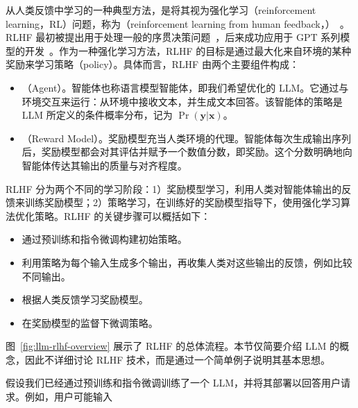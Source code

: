 从人类反馈中学习的一种典型方法，是将其视为强化学习（reinforcement learning，RL）问题，称为（reinforcement learning from human feedback，）~\cite{ouyang-etal:2022training}。RLHF 最初被提出用于处理一般的序贯决策问题~\cite{christiano-etal:2017deep}，后来成功应用于 GPT 系列模型的开发~\cite{stiennon-etal:2020learning}。作为一种强化学习方法，RLHF 的目标是通过最大化来自环境的某种奖励来学习策略（policy）。具体而言，RLHF 由两个主要组件构成：

\begin{itemize}
\item \vspace{0.5em} （Agent）。智能体也称语言模型智能体，即我们希望优化的 LLM。它通过与环境交互来运行：从环境中接收文本，并生成文本回答。该智能体的策略是 LLM 所定义的条件概率分布，记为 $\Pr(\mathbf{y} | \mathbf{x})$。
\item \vspace{0.3em} （Reward Model）。奖励模型充当人类环境的代理。智能体每次生成输出序列后，奖励模型都会对其评估并赋予一个数值分数，即奖励。这个分数明确地向智能体传达其输出的质量与对齐程度。
\end{itemize}
\vspace{0.5em}

RLHF 分为两个不同的学习阶段：1）奖励模型学习，利用人类对智能体输出的反馈来训练奖励模型；2）策略学习，在训练好的奖励模型指导下，使用强化学习算法优化策略。RLHF 的关键步骤可以概括如下：

\begin{itemize}
\item \vspace{0.5em} 通过预训练和指令微调构建初始策略。
\item \vspace{0.3em} 利用策略为每个输入生成多个输出，再收集人类对这些输出的反馈，例如比较不同输出。
\item \vspace{0.3em} 根据人类反馈学习奖励模型。
\item \vspace{0.3em} 在奖励模型的监督下微调策略。
\end{itemize}
\vspace{0.5em}

图~\ref{fig:llm-rlhf-overview} 展示了 RLHF 的总体流程。本节仅简要介绍 LLM 的概念，因此不详细讨论 RLHF 技术，而是通过一个简单例子说明其基本思想。

假设我们已经通过预训练和指令微调训练了一个 LLM，并将其部署以回答用户请求。例如，用户可能输入

